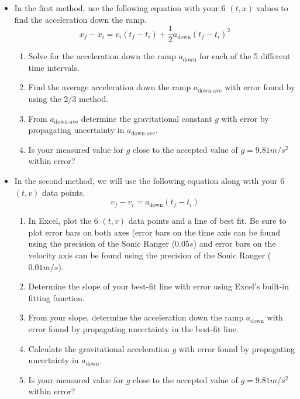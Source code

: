 \begin{itemize}
\item{In the first method, use the following equation with your 6 $(t,x)$ values to find the acceleration down the ramp.
\begin{equation}
    x_f - x_i =   v_{i}(t_f - t_i) + \frac{1}{2}a_\text{down}(t_f  - t_i )^2
\end{equation}
\begin{enumerate}
\item Solve for the acceleration down the ramp $a_\text{down}$ for each of the 5 different time intervals.
\item  Find the average acceleration down the ramp $a_{\text{down-ave}}$ with error found by using the 2/3 method.
\item From $a_\text{down-ave}$ determine the gravitational constant $g$ with error by propagating uncertainty in $a_{\text{down-ave}}$.
\item Is your measured value for $g$ close to the accepted value of $g=9.81 m/s^2$ within error?
\end{enumerate}
}
\item{In the second method, we will use the following equation along with your 6 $(t,v)$ data points.
\begin{equation}
    v_f - v_{i} = a_\text{down} (t_f - t_i)
\end{equation}
\begin{enumerate}
\item In Excel, plot the 6 $(t,v)$ data points and a line of best fit. Be sure to plot error bars on both axes (error bars on the time axis can be found using the precision of the Sonic Ranger ($0.05 s$) and error bars on the velocity axis can be found using the precision of the Sonic Ranger ($0.01 m/s$).
\item Determine the slope of your best-fit line with error using Excel's built-in fitting function.
\item From your slope, determine the acceleration down the ramp $a_{\text{down}}$ with error found by propagating uncertainty in the best-fit line.
\item Calculate the gravitational acceleration $g$ with error found by propagating uncertainty in $a_\text{down}$.
\item Is your measured value for $g$ close to the accepted value of $g=9.81 m/s^2$ within error?
\end{enumerate}
}
\end{itemize}
